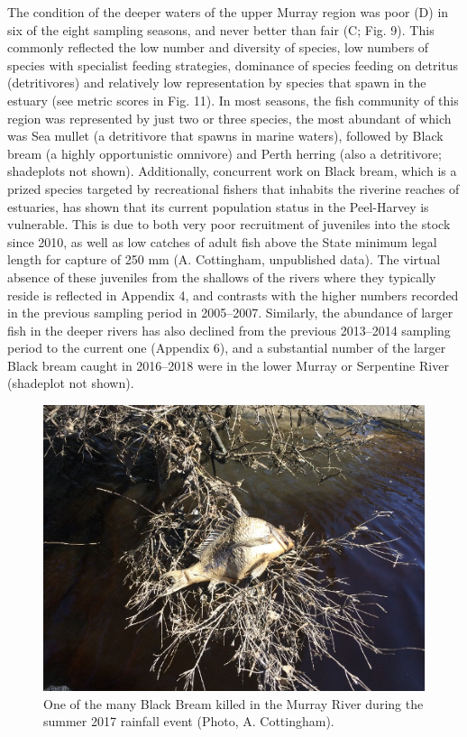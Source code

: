\documentclass[
]{book}
\begin{document}
The condition of the deeper waters of the upper Murray region was poor (D) in six of the eight sampling seasons, and never better than fair (C; Fig. 9). This commonly reflected the low number and diversity of species, low numbers of species with specialist feeding strategies, dominance of species feeding on detritus (detritivores) and relatively low representation by species that spawn in the estuary (see metric scores in Fig. 11). In most seasons, the fish community of this region was represented by just two or three species, the most abundant of which was Sea mullet (a detritivore that spawns in marine waters), followed by Black bream (a highly opportunistic omnivore) and Perth herring (also a detritivore; shadeplots not shown). Additionally, concurrent work on Black bream, which is a prized species targeted by recreational fishers that inhabits the riverine reaches of estuaries, has shown that its current population status in the Peel-Harvey is vulnerable. This is due to both very poor recruitment of juveniles into the stock since 2010, as well as low catches of adult fish above the State minimum legal length for capture of 250 mm (A. Cottingham, unpublished data). The virtual absence of these juveniles from the shallows of the rivers where they typically reside is reflected in Appendix 4, and contrasts with the higher numbers recorded in the previous sampling period in 2005--2007. Similarly, the abundance of larger fish in the deeper rivers has also declined from the previous 2013--2014 sampling period to the current one (Appendix 6), and a substantial number of the larger Black bream caught in 2016--2018 were in the lower Murray or Serpentine River (shadeplot not shown).

\begin{figure}
\includegraphics[width=0.5\linewidth]{images/fish_ecology/picture10} \caption{One of the many Black Bream killed in the Murray River during the summer 2017 rainfall event (Photo, A. Cottingham).}\label{fig:fish-ecology-pic10}
\end{figure}
\end{document}
